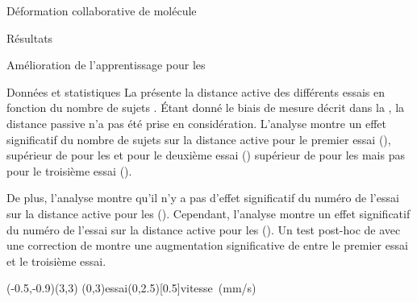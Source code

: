 \documentclass[myfrancais,ngerman,english,french]{mythesis}
\begin{document}
\begin{mychapter}{Déformation collaborative de molécule}
\begin{mysection}{Résultats}
\begin{mysubsection}{Amélioration de l'apprentissage pour les }
\begin{mysubsubsection}{Données et statistiques}
					La  présente la distance active  des différents essais  en fonction du nombre de sujets .
					Étant donné le biais de mesure décrit dans la , la distance passive n'a pas été prise en considération.
					L'analyse montre un effet significatif du nombre de sujets  sur la distance active  pour le premier essai (), supérieur de  pour les  et pour le deuxième essai () supérieur de  pour les  mais pas pour le troisième essai ().

					De plus, l'analyse montre qu'il n'y a pas d'effet significatif du numéro de l'essai  sur la distance active  pour les  ().
					Cependant, l'analyse montre un effet significatif du numéro de l'essai  sur la distance active  pour les  ().
					Un test post-hoc de  avec une correction de  montre une augmentation significative de  entre le premier essai et le troisième essai.

					\begin{myfigure}
						\begin{myps}(-0.5,-0.9)(3,3)
							\myaxes(0,3){essai}(0,2.5)[0.5]{vitesse~(mm/s)}
						\end{myps}
					\end{myfigure}


\end{mysubsubsection}
\end{mysubsection}
\end{mysection}
\end{mychapter}
\end{document}
